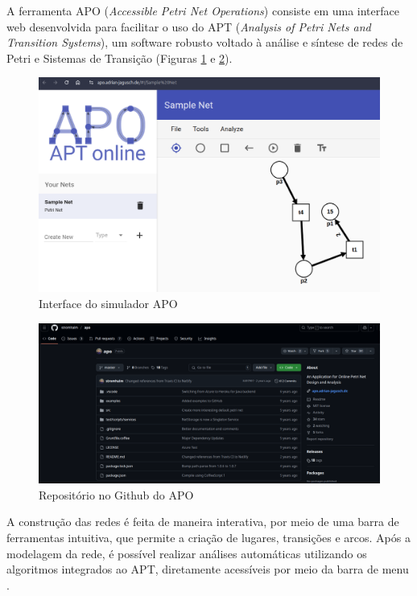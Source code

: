 \documentclass[
	12pt,				%
	openright,			%
	oneside,			%
	a4paper,			%
	english,			%
	brazil				%
	]{abntex2}
\theoremstyle{doispontos}
\begin{document}
A ferramenta APO (\textit{Accessible Petri Net Operations}) consiste em uma interface web desenvolvida para facilitar o uso do APT (\textit{Analysis of Petri Nets and Transition Systems}), um software robusto voltado à análise e síntese de redes de Petri e Sistemas de Transição (Figuras \ref{fig:interfaceAPO} e \ref{fig:pipeAPO}). 

\begin{figure}[ht] 
	\centering
	\includegraphics[scale=0.30]{figuras/apoInterface.png}
	\caption[Interface do simulador APO]{Interface do simulador APO}
	\label{fig:interfaceAPO}
\end{figure}
\FloatBarrier

\begin{figure}[ht] 
	\centering
	\includegraphics[scale=0.30]{figuras/apoRepo.png}
	\caption[Repositório no Github do APO]{Repositório no Github do APO}
	\label{fig:pipeAPO}
\end{figure}
\FloatBarrier

A construção das redes é feita de maneira interativa, por meio de uma barra de ferramentas intuitiva, que permite a criação de lugares, transições e arcos. Após a modelagem da rede, é possível realizar análises automáticas utilizando os algoritmos integrados ao APT, diretamente acessíveis por meio da barra de menu \textcite{apoGithub}. 
\end{document}
